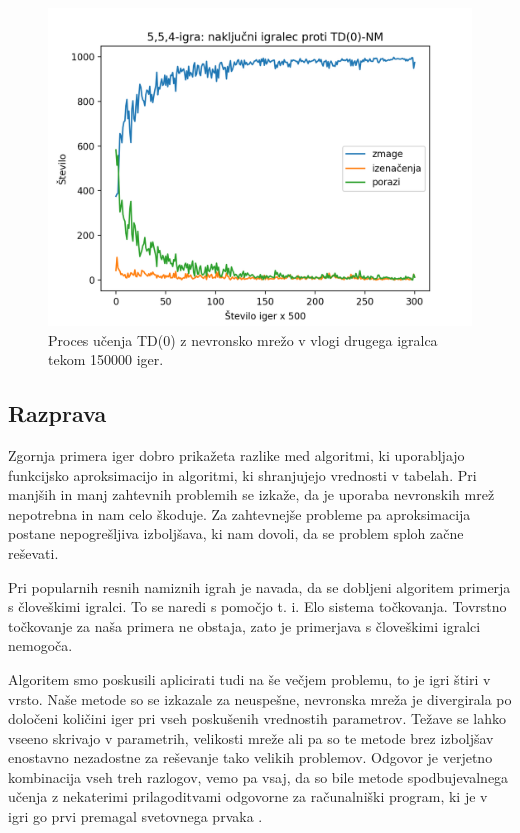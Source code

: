 \documentclass[12pt,a4paper]{amsart}
\theoremstyle{definition} %
\theoremstyle{plain} %
\begin{document}
\begin{figure}[H]
    \includegraphics[scale=0.715]{../rezultati/tdnn-554-150000-2.png}
    \caption{Proces učenja TD($0$) z nevronsko mrežo v vlogi drugega igralca tekom 150000 iger.}
    \label{graf:3}
\end{figure}

\subsection{Razprava}
Zgornja primera iger dobro prikažeta razlike med algoritmi, ki uporabljajo funkcijsko aproksimacijo 
in algoritmi, ki shranjujejo vrednosti v tabelah. Pri manjših in manj zahtevnih problemih se izkaže, 
da je uporaba nevronskih mrež nepotrebna in nam celo škoduje. Za zahtevnejše probleme pa aproksimacija
postane nepogrešljiva izboljšava, ki nam dovoli, da se problem sploh začne reševati. 

Pri popularnih resnih namiznih igrah je navada, da se dobljeni algoritem primerja s človeškimi igralci. 
To se naredi s pomočjo t. i. Elo sistema točkovanja. Tovrstno točkovanje za naša primera ne obstaja, zato 
je primerjava s človeškimi igralci nemogoča. 

Algoritem smo poskusili aplicirati tudi na še večjem problemu, to je igri štiri v vrsto. Naše metode so 
se izkazale za neuspešne, nevronska mreža je divergirala po določeni količini iger pri vseh poskušenih 
vrednostih parametrov. Težave se lahko vseeno skrivajo v parametrih, velikosti mreže ali pa so te metode 
brez izboljšav enostavno nezadostne za reševanje tako velikih problemov. Odgovor je verjetno kombinacija 
vseh treh razlogov, vemo pa vsaj, da so bile metode spodbujevalnega učenja z nekaterimi prilagoditvami
odgovorne za računalniški program, ki je v igri go prvi premagal svetovnega prvaka \cite{go}.
\end{document}
